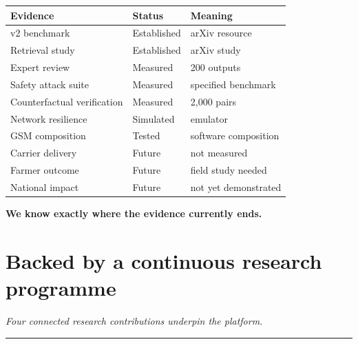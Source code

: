 \documentclass[11pt,a4paper]{article}
\newcommand{\takeaway}[1]{{\color{kcgrey}\itshape\large #1}\par\vspace{2pt}%
  {\color{kcline}\rule{\linewidth}{0.8pt}}\par\vspace{6pt}}
\begin{document}
\vspace{8pt}
\begin{center}\footnotesize
\begin{tabular}{lll}
\toprule
\textbf{Evidence} & \textbf{Status} & \textbf{Meaning}\\
\midrule
v2 benchmark & Established & arXiv resource\\
Retrieval study & Established & arXiv study\\
Expert review & Measured & 200 outputs\\
Safety attack suite & Measured & specified benchmark\\
Counterfactual verification & Measured & 2,000 pairs\\
Network resilience & Simulated & emulator\\
GSM composition & Tested & software composition\\
Carrier delivery & Future & not measured\\
Farmer outcome & Future & field study needed\\
National impact & Future & not yet demonstrated\\
\bottomrule
\end{tabular}
\end{center}

\begin{pullquote}
{\bfseries\color{kcgreen}We know exactly where the evidence currently ends.}
\end{pullquote}

\newpage
\section*{\color{kcgreen}Backed by a continuous research programme}
\takeaway{Four connected research contributions underpin the platform.}
\end{document}
